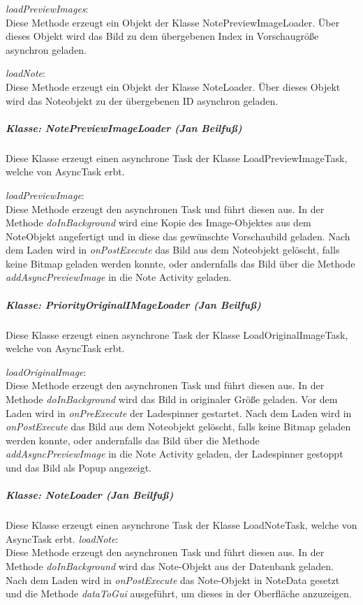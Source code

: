 \textit{loadPreviewImages}:\\
Diese Methode erzeugt ein Objekt der Klasse NotePreviewImageLoader. Über dieses Objekt wird das Bild zu dem übergebenen Index in Vorschaugröße asynchron geladen.

\textit{loadNote}:\\
Diese Methode erzeugt ein Objekt der Klasse NoteLoader. Über dieses Objekt wird das Noteobjekt zu der übergebenen ID asynchron geladen.

\subparagraph*{Klasse: NotePreviewImageLoader (Jan Beilfuß)}
Diese Klasse erzeugt einen asynchrone Task der Klasse LoadPreviewImageTask, welche von AsyncTask erbt.

\textit{loadPreviewImage}:\\
Diese Methode erzeugt den asynchronen Task und führt diesen aus. In der Methode \textit{doInBackground} wird eine Kopie des Image-Objektes aus dem NoteObjekt angefertigt und in diese das gewünschte Vorschaubild geladen. Nach dem Laden wird in \textit{onPostExecute} das Bild aus dem Noteobjekt gelöscht, falls keine Bitmap geladen werden konnte, oder andernfalls das Bild über die Methode \textit{addAsyncPreviewImage} in die Note Activity geladen.

\subparagraph*{Klasse: PriorityOriginalIMageLoader (Jan Beilfuß)}
Diese Klasse erzeugt einen asynchrone Task der Klasse LoadOriginalImageTask, welche von AsyncTask erbt.

\textit{loadOriginalImage}:\\
Diese Methode erzeugt den asynchronen Task und führt diesen aus. In der Methode \textit{doInBackground} wird das Bild in originaler Größe geladen. Vor dem Laden wird in \textit{onPreExecute} der Ladespinner gestartet. Nach dem Laden wird in \textit{onPostExecute} das Bild aus dem Noteobjekt gelöscht, falls keine Bitmap geladen werden konnte, oder andernfalls das Bild über die Methode \textit{addAsyncPreviewImage} in die Note Activity geladen, der Ladespinner gestoppt und das Bild als Popup angezeigt.

\subparagraph*{Klasse: NoteLoader (Jan Beilfuß)}
Diese Klasse erzeugt einen asynchrone Task der Klasse LoadNoteTask, welche von AsyncTask erbt.
\textit{loadNote}:\\
Diese Methode erzeugt den asynchronen Task und führt diesen aus. In der Methode \textit{doInBackground} wird das Note-Objekt aus der Datenbank geladen. Nach dem Laden wird in \textit{onPostExecute} das Note-Objekt in NoteData gesetzt und die Methode \textit{dataToGui} ausgeführt, um dieses in der Oberfläche anzuzeigen.

